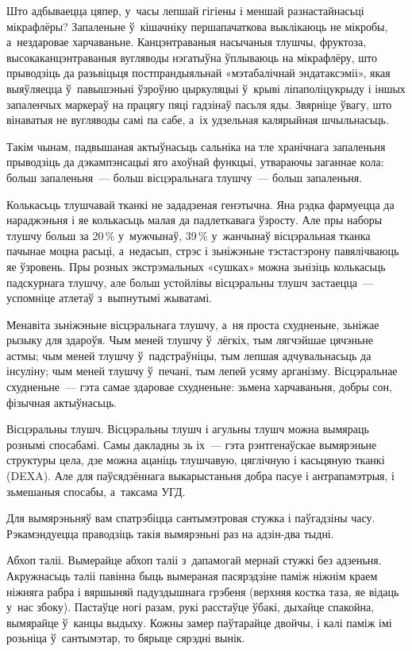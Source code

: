 Што адбываецца цяпер, у~часы лепшай гігіены і меншай разнастайнасьці мікрафлёры? Запаленьне ў~кішачніку першапачаткова выклікаюць не мікробы, а~нездаровае харчаваньне. Канцэнтраваныя насычаныя тлушчы, фруктоза, высокаканцэнтраваныя вугляводы нэгатыўна ўплываюць на мікрафлёру, што прыводзіць да разьвіцьця постпрандыяльнай «мэтабалічнай эндатаксэміі», якая выяўляецца ў~павышэньні ўзроўню цыркуляцыі ў~крыві ліпаполіцукрыду і іншых запаленчых маркераў на працягу пяці гадзінаў пасьля яды. Звярніце ўвагу, што вінаватыя не вугляводы самі па сабе, а~іх удзельная калярыйная шчыльнасьць.

Такім чынам, падвышаная актыўнасьць сальніка на тле хранічнага запаленьня прыводзіць да дэкампэнсацыі яго ахоўнай функцыі, утвараючы заганнае кола: больш запаленьня~--- больш вісцэральнага тлушчу~--- больш запаленьня.

Колькасьць тлушчавай тканкі не зададзеная генэтычна. Яна рэдка фармуецца да нараджэньня і яе колькасьць малая да падлеткавага ўзросту. Але пры наборы тлушчу больш за 20\,\% у~мужчынаў, 39\,\% у~жанчынаў вісцэральная тканка пачынае моцна расьці, а~недасып, стрэс і зьніжэньне тэстастэрону павялічваюць яе ўзровень. Пры розных экстрэмальных «сушках» можна зьнізіць колькасьць падскурнага тлушчу, але больш устойлівы вісцэральны тлушч застаецца~--- успомніце атлетаў з~выпнутымі жыватамі.

Менавіта зьніжэньне вісцэральнага тлушчу, а~ня проста схудненьне, зьніжае рызыку для здароўя. Чым меней тлушчу ў~лёгкіх, тым лягчэйшае цячэньне астмы; чым меней тлушчу ў~падстраўніцы, тым лепшая адчувальнасьць да інсуліну; чым меней тлушчу ў~печані, тым лепей усяму арганізму. Вісцэральнае схудненьне~--- гэта самае здаровае схудненьне: зьмена харчаваньня, добры сон, фізычная актыўнасьць.

Вісцэральны тлушч. Вісцэральны тлушч і агульны тлушч можна вымяраць рознымі спосабамі. Самы дакладны зь іх~--- гэта рэнтгенаўскае вымярэньне структуры цела, дзе можна ацаніць тлушчавую, цяглічную і касьцяную тканкі (DEXA). Але для паўсядзённага выкарыстаньня добра пасуе і антрапамэтрыя, і зьмешаныя спосабы, а~таксама УГД.

Для вымярэньняў вам спатрэбіцца сантымэтровая стужка і паўгадзіны часу. Рэкамэндуецца праводзіць такія вымярэньні раз на адзін-два тыдні.

Абхоп таліі. Вымерайце абхоп таліі з~дапамогай мернай стужкі без адзеньня. Акружнасьць таліі павінна быць вымераная пасярэдзіне паміж ніжнім краем ніжняга рабра і вяршыняй падуздышнага грэбеня (верхняя костка таза, яе відаць у~нас збоку). Пастаўце ногі разам, рукі расстаўце ўбакі, дыхайце спакойна, вымярайце ў~канцы выдыху. Кожны замер паўтарайце двойчы, і калі паміж імі розьніца ў~сантымэтар, то бярыце сярэдні вынік.

